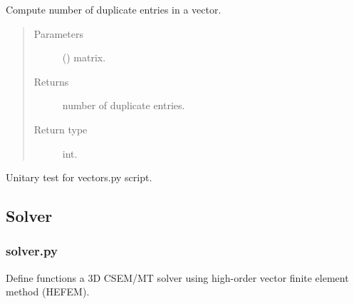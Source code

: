 \documentclass[letterpaper,10pt,english]{sphinxmanual}
\begin{document}

\begin{fulllineitems}
\label{\detokenize{petgem/vectors:petgem.vectors.is_duplicate_entry}}
Compute number of duplicate entries in a vector.
\begin{quote}\begin{description}
\item[{Parameters}] \leavevmode
{} () \textendash{} matrix.

\item[{Returns}] \leavevmode
number of duplicate entries.

\item[{Return type}] \leavevmode
int.

\end{description}\end{quote}

\end{fulllineitems}


\begin{fulllineitems}
\label{\detokenize{petgem/vectors:petgem.vectors.unitary_test}}
Unitary test for vectors.py script.

\end{fulllineitems}



\subsection{Solver}
\label{\detokenize{Manual:solver}}

\subsubsection{solver.py}
\label{\detokenize{petgem/solver:module-petgem.solver}}\label{\detokenize{petgem/solver:solver-py}}\label{\detokenize{petgem/solver::doc}}
Define functions a 3D CSEM/MT solver using high-order vector finite element method (HEFEM).
\end{document}
